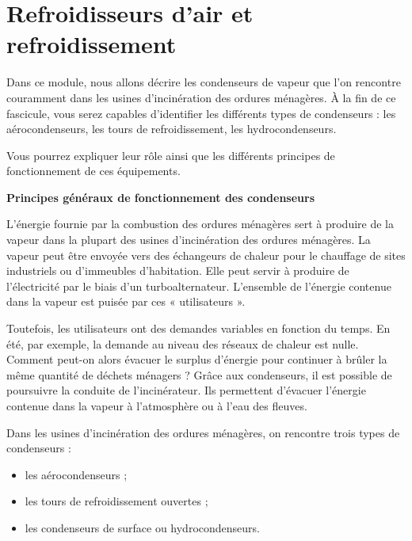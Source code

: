 \chapter{Refroidisseurs d'air et refroidissement}

Dans ce module, nous allons décrire les condenseurs de vapeur que l’on rencontre couramment dans les usines d’incinération des ordures ménagères. À la fin de ce fascicule, vous serez capables d’identifier les différents types de condenseurs : les aérocondenseurs, les tours de refroidissement, les hydrocondenseurs.
\vspace{0.3cm}

Vous pourrez expliquer leur rôle ainsi que les différents principes de fonctionnement de ces équipements.


\vspace{0.3cm}
\textbf{Principes généraux de fonctionnement des condenseurs}
\vspace{0.3cm}


L’énergie fournie par la combustion des ordures ménagères sert à produire de la vapeur dans la plupart des usines d’incinération des ordures ménagères. La vapeur peut être envoyée vers des échangeurs de chaleur pour le chauffage de sites industriels ou d’immeubles d’habitation. Elle peut servir à produire de l’électricité par le biais d’un turboalternateur. L’ensemble de l’énergie contenue dans la vapeur est puisée par ces « utilisateurs ».
\vspace{0.3cm}

Toutefois, les utilisateurs ont des demandes variables en fonction du temps. En été, par exemple, la demande au niveau des réseaux de chaleur est nulle. Comment peut-on alors évacuer le surplus d’énergie pour continuer à brûler la même quantité de déchets ménagers ? Grâce aux condenseurs, il est possible de poursuivre la conduite de l’incinérateur. Ils permettent d’évacuer l’énergie contenue dans la vapeur à l’atmosphère ou à l’eau des fleuves.
\vspace{0.3cm}

Dans les usines d’incinération des ordures ménagères, on rencontre trois types de condenseurs :

\begin{itemize}
\item  les aérocondenseurs ;
\item  les tours de refroidissement ouvertes ;
\item  les condenseurs de surface ou hydrocondenseurs.
\end{itemize}

